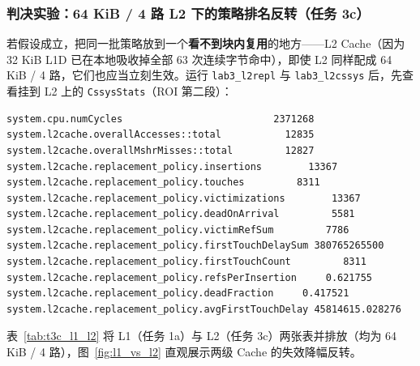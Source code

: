 \documentclass[12pt,a4paper,fontset=mac]{ctexart}
\begin{document}
\subsubsection{判决实验：64 KiB / 4 路 L2 下的策略排名反转（任务 3c）}
若假设成立，把同一批策略放到一个\textbf{看不到块内复用}的地方——L2 Cache（因为 32 KiB L1D 已在本地吸收掉全部 63 次连续字节命中），即使 L2 同样配成 64 KiB / 4 路，它们也应当立刻生效。运行 \texttt{lab3\_l2repl} 与 \texttt{lab3\_l2cssys} 后，先查看挂到 L2 上的 \texttt{CssysStats}（ROI 第二段）：

\begin{lstlisting}[language={},caption={任务 3c：L2（64 KiB / 4 路）ROI 段 CssysStats 实测输出}]
system.cpu.numCycles                          2371268
system.l2cache.overallAccesses::total           12835
system.l2cache.overallMshrMisses::total         12827
system.l2cache.replacement_policy.insertions        13367
system.l2cache.replacement_policy.touches         8311
system.l2cache.replacement_policy.victimizations        13367
system.l2cache.replacement_policy.deadOnArrival         5581
system.l2cache.replacement_policy.victimRefSum         7786
system.l2cache.replacement_policy.firstTouchDelaySum 380765265500
system.l2cache.replacement_policy.firstTouchCount         8311
system.l2cache.replacement_policy.refsPerInsertion     0.621755
system.l2cache.replacement_policy.deadFraction     0.417521
system.l2cache.replacement_policy.avgFirstTouchDelay 45814615.028276
\end{lstlisting}

表~\ref{tab:t3c_l1_l2} 将 L1（任务 1a）与 L2（任务 3c）两张表并排放（均为 64 KiB / 4 路），图~\ref{fig:l1_vs_l2} 直观展示两级 Cache 的失效降幅反转。
\end{document}
